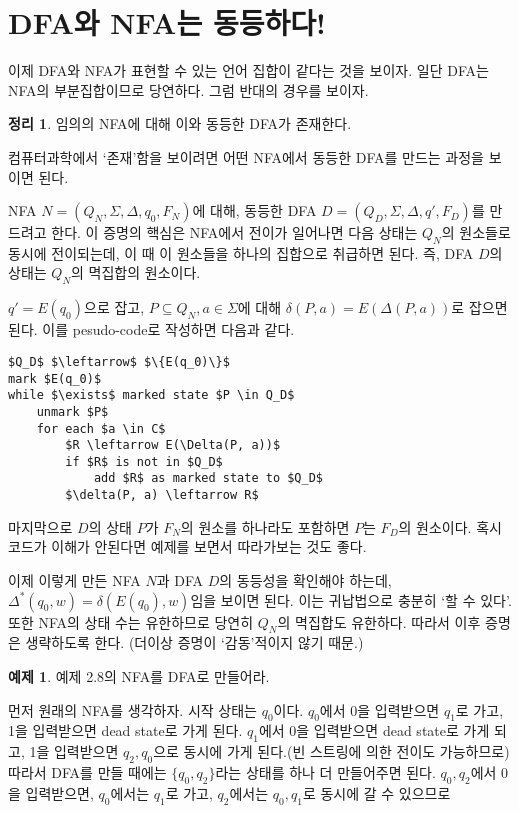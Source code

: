 \documentclass[b5paper]{book}
\theoremstyle{definition}
\newtheorem{thm}{정리}[chapter]
\newtheorem{ex}{예제}[chapter]
\newenvironment{pf*}{\pushQED{\qed}\pf}{\popQED\endpf}
\begin{document}
\section{DFA와 NFA는 동등하다!}
이제 DFA와 NFA가 표현할 수 있는 언어 집합이 같다는 것을 보이자.
일단 DFA는 NFA의 부분집합이므로 당연하다. 그럼 반대의 경우를 보이자.
\begin{thm}임의의 NFA에 대해 이와 동등한 DFA가 존재한다.
\end{thm}
\begin{pf*}
    컴퓨터과학에서 `존재'함을 보이려면 어떤 NFA에서 동등한 DFA를 만드는 
과정을 보이면 된다. 

NFA $N = (Q_N, \Sigma, \Delta, q_0, F_N)$에 대해, 동등한 DFA $D = (
    Q_D, \Sigma, \Delta, q', F_D
)$를 만드려고 한다. 이 증명의 핵심은 NFA에서 전이가 일어나면 다음 상태는 $Q_N$의
원소들로 동시에 전이되는데, 이 때 이 원소들을 하나의 집합으로 취급하면 된다. 
즉, DFA $D$의 상태는 $Q_N$의 멱집합의 원소이다. 

$q' = E(q_0)$으로 잡고, $P \subseteq Q_N, a \in \Sigma$에 대해 $\delta(P, a) = E(
    \Delta(P, a)
)$로 잡으면 된다. 이를 pesudo-code로 작성하면 다음과 같다.
\begin{lstlisting}
$Q_D$ $\leftarrow$ $\{E(q_0)\}$
mark $E(q_0)$
while $\exists$ marked state $P \in Q_D$
    unmark $P$
    for each $a \in C$
        $R \leftarrow E(\Delta(P, a))$
        if $R$ is not in $Q_D$
            add $R$ as marked state to $Q_D$ 
        $\delta(P, a) \leftarrow R$
\end{lstlisting}
마지막으로 $D$의 상태 $P$가 $F_N$의 원소를 하나라도 포함하면 $P$는 $F_D$의 원소이다. 
혹시 코드가 이해가 안된다면 예제를 보면서 따라가보는 것도 좋다.

이제 이렇게 만든 NFA $N$과 DFA $D$의 동등성을 확인해야 하는데, 
$\Delta^*(q_0, w) = \delta(E(q_0), w)$임을 보이면 된다.
이는 귀납법으로 충분히 `할 수 있다'.
또한 NFA의 상태 수는 유한하므로 당연히 $Q_N$의 멱집합도 유한하다. 
따라서 이후 증명은 생략하도록 한다. (더이상 증명이 `감동'적이지 않기 때문.)
\end{pf*}
\begin{ex}예제 2.8의 NFA를 DFA로 만들어라. 
\end{ex} 
먼저 원래의 NFA를 생각하자. 시작 상태는 $q_0$이다. $q_0$에서 0을 입력받으면 $q_1$로 가고, 1을 입력받으면
dead state로 가게 된다. $q_1$에서 0을 입력받으면 dead state로 가게 되고, 1을 
입력받으면 $q_2, q_0$으로 동시에 가게 된다.(빈 스트링에 의한 전이도 가능하므로) 따라서
DFA를 만들 때에는 $\{q_0, q_2\}$라는 상태를 하나 더 만들어주면 된다. ${q_0, q_2}$에서
0을 입력받으면, $q_0$에서는 $q_1$로 가고, $q_2$에서는 ${q_0, q_1}$로 동시에 갈 수 있으므로
\end{document}
